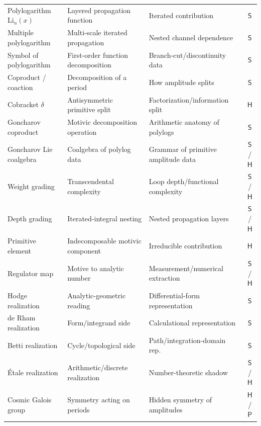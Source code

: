 \documentclass[12pt]{article}
\theoremstyle{definition}
\theoremstyle{remark}
\newcommand{\Li}{\mathrm{Li}}
\newcommand{\cobr}{\delta}
\newcommand{\Slab}{\ensuremath{\mathsf{S}}}
\newcommand{\Hlab}{\ensuremath{\mathsf{H}}}
\newcommand{\Plab}{\ensuremath{\mathsf{P}}}
\begin{document}
\begin{longtable}{@{}L{0.26\textwidth} L{0.31\textwidth} L{0.29\textwidth} c@{}}
Polylogarithm $\Li_n(x)$ & Layered propagation function & Iterated contribution & \Slab \\
Multiple polylogarithm & Multi-scale iterated propagation & Nested channel dependence & \Slab \\
Symbol of polylogarithm & First-order function decomposition & Branch-cut/discontinuity data & \Slab \\
Coproduct / coaction & Decomposition of a period & How amplitude splits & \Slab \\
Cobracket $\cobr$ & Antisymmetric primitive split & Factorization/information split & \Hlab \\
Goncharov coproduct & Motivic decomposition operation & Arithmetic anatomy of polylogs & \Slab \\
Goncharov Lie coalgebra & Coalgebra of polylog data & Grammar of primitive amplitude data & \Slab/\Hlab \\
Weight grading & Transcendental complexity & Loop depth/functional complexity & \Slab/\Hlab \\
Depth grading & Iterated-integral nesting & Nested propagation layers & \Slab/\Hlab \\
Primitive element & Indecomposable motivic component & Irreducible contribution & \Hlab \\
Regulator map & Motive to analytic number & Measurement/numerical extraction & \Slab/\Hlab \\
Hodge realization & Analytic-geometric reading & Differential-form representation & \Slab \\
de Rham realization & Form/integrand side & Calculational representation & \Slab \\
Betti realization & Cycle/topological side & Path/integration-domain rep. & \Slab \\
\'Etale realization & Arithmetic/discrete realization & Number-theoretic shadow & \Slab/\Hlab \\
Cosmic Galois group & Symmetry acting on periods & Hidden symmetry of amplitudes & \Hlab/\Plab \\
\end{longtable}
\end{document}
